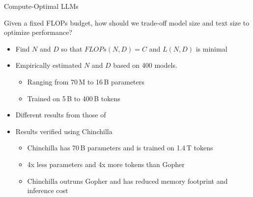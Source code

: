 
\begin{vbframe}{Compute-Optimal LLM\MakeLowercase{s}}

Given a fixed FLOPs budget, how should we trade-off model size and text size to optimize performance? 

\vfill

\begin{itemize}

	\item Find $N$ and $D$ so that $FLOPs(N,D) = C$ and $L(N,D)$ is minimal

	\item Empirically estimated $N$ and $D$ based on 400 models. 
	\begin{itemize}
	\item Ranging from 70\,M to 16\,B parameters
	\item Trained on 5\,B to 400\,B tokens
	\end{itemize}

	\item Different results from those of  
	\item Results verified using Chinchilla
	\begin{itemize}
	\item Chinchilla has 70\,B parameters and is trained on 1.4\,T tokens
	\item 4x less parameters and 4x more tokens than Gopher
	\item Chinchilla outruns Gopher and has reduced memory footprint and inference cost 
	\end{itemize}

\end{itemize}

\vfill

\end{vbframe}


